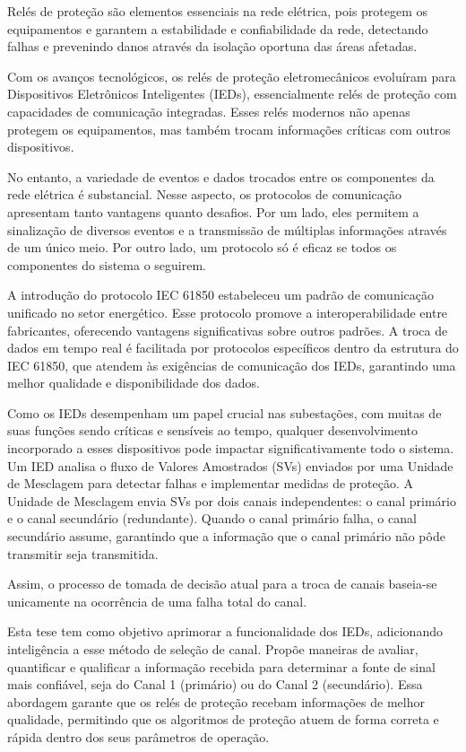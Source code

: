 \begin{abstractotherlanguage}
	
	Relés de proteção são elementos essenciais na rede elétrica, pois protegem os equipamentos e garantem a estabilidade e confiabilidade da rede, detectando falhas e prevenindo danos através da isolação oportuna das áreas afetadas.
	
	Com os avanços tecnológicos, os relés de proteção eletromecânicos evoluíram para Dispositivos Eletrônicos Inteligentes (IEDs), essencialmente relés de proteção com capacidades de comunicação integradas. Esses relés modernos não apenas protegem os equipamentos, mas também trocam informações críticas com outros dispositivos.
	
	No entanto, a variedade de eventos e dados trocados entre os componentes da rede elétrica é substancial. Nesse aspecto, os protocolos de comunicação apresentam tanto vantagens quanto desafios. Por um lado, eles permitem a sinalização de diversos eventos e a transmissão de múltiplas informações através de um único meio. Por outro lado, um protocolo só é eficaz se todos os componentes do sistema o seguirem.
	
	A introdução do protocolo IEC 61850 estabeleceu um padrão de comunicação unificado no setor energético. Esse protocolo promove a interoperabilidade entre fabricantes, oferecendo vantagens significativas sobre outros padrões. A troca de dados em tempo real é facilitada por protocolos específicos dentro da estrutura do IEC 61850, que atendem às exigências de comunicação dos IEDs, garantindo uma melhor qualidade e disponibilidade dos dados.
	
	Como os IEDs desempenham um papel crucial nas subestações, com muitas de suas funções sendo críticas e sensíveis ao tempo, qualquer desenvolvimento incorporado a esses dispositivos pode impactar significativamente todo o sistema. Um IED analisa o fluxo de Valores Amostrados (SVs) enviados por uma Unidade de Mesclagem para detectar falhas e implementar medidas de proteção. A Unidade de Mesclagem envia SVs por dois canais independentes: o canal primário e o canal secundário (redundante). Quando o canal primário falha, o canal secundário assume, garantindo que a informação que o canal primário não pôde transmitir seja transmitida.
	
	Assim, o processo de tomada de decisão atual para a troca de canais baseia-se unicamente na ocorrência de uma falha total do canal.
	
	Esta tese tem como objetivo aprimorar a funcionalidade dos IEDs, adicionando inteligência a esse método de seleção de canal. Propõe maneiras de avaliar, quantificar e qualificar a informação recebida para determinar a fonte de sinal mais confiável, seja do Canal 1 (primário) ou do Canal 2 (secundário). Essa abordagem garante que os relés de proteção recebam informações de melhor qualidade, permitindo que os algoritmos de proteção atuem de forma correta e rápida dentro dos seus parâmetros de operação.
		
\end{abstractotherlanguage}

